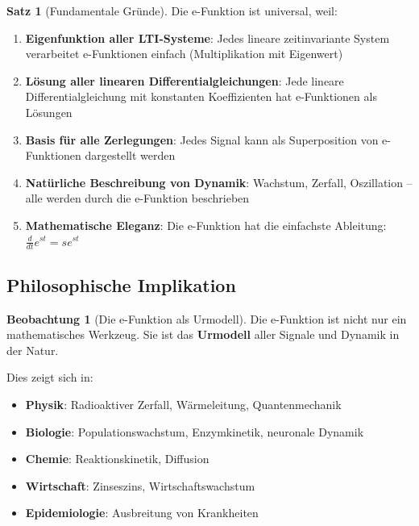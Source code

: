 ﻿\documentclass[a4paper,12pt]{report}
\theoremstyle{definition}
\newtheorem{satz}{Satz}
\newtheorem{beobachtung}{Beobachtung}
\begin{document}
	\begin{satz}[Fundamentale Gründe]
		Die e-Funktion ist universal, weil:
		
		\begin{enumerate}
			\item[-] \textbf{Eigenfunktion aller LTI-Systeme}: Jedes lineare zeitinvariante System verarbeitet e-Funktionen einfach (Multiplikation mit Eigenwert)
			
			\item[-] \textbf{Lösung aller linearen Differentialgleichungen}: Jede lineare Differentialgleichung mit konstanten Koeffizienten hat e-Funktionen als Lösungen
			
			\item[-] \textbf{Basis für alle Zerlegungen}: Jedes Signal kann als Superposition von e-Funktionen dargestellt werden
			
			\item[-] \textbf{Natürliche Beschreibung von Dynamik}: Wachstum, Zerfall, Oszillation -- alle werden durch die e-Funktion beschrieben
			
			\item[-] \textbf{Mathematische Eleganz}: Die e-Funktion hat die einfachste Ableitung: $\frac{d}{dt} e^{st} = s e^{st}$
		\end{enumerate}
	\end{satz}
	
	\subsection{Philosophische Implikation}
	
	\begin{beobachtung}[Die e-Funktion als Urmodell]
		Die e-Funktion ist nicht nur ein mathematisches Werkzeug. Sie ist das \textbf{Urmodell} aller Signale und Dynamik in der Natur.
		
		Dies zeigt sich in:
		\begin{itemize}
			\item[-] \textbf{Physik}: Radioaktiver Zerfall, Wärmeleitung, Quantenmechanik
			\item[-] \textbf{Biologie}: Populationswachstum, Enzymkinetik, neuronale Dynamik
			\item[-] \textbf{Chemie}: Reaktionskinetik, Diffusion
			\item[-] \textbf{Wirtschaft}: Zinseszins, Wirtschaftswachstum
			\item[-] \textbf{Epidemiologie}: Ausbreitung von Krankheiten
		\end{itemize}
	\end{beobachtung}
	
\end{document}
